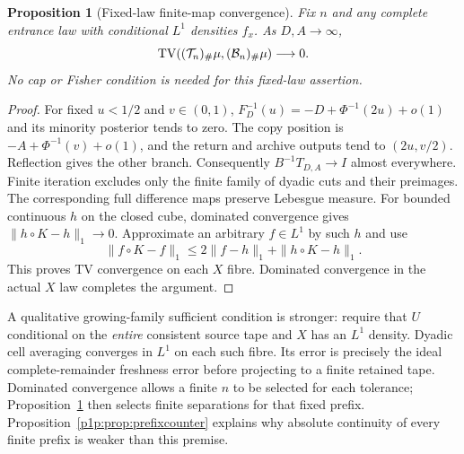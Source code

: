 \documentclass[11pt]{article}
\numberwithin{equation}{section}
\newtheorem{proposition}[theorem]{Proposition}
\theoremstyle{definition}
\theoremstyle{remark}
\begin{document}
\begin{proposition}[Fixed-law finite-map convergence]\label{p1p:prop:L1}
Fix $n$ and any complete entrance law with conditional $L^1$ densities
$f_x$. As $D,A\to\infty$,
\[
 \operatorname{TV}((\mathcal T_n)_\#\mu,(\mathcal B_n)_\#\mu)\longrightarrow0.
\]
No cap or Fisher condition is needed for this fixed-law assertion.
\end{proposition}
\begin{proof}
For fixed $u<1/2$ and $v\in(0,1)$,
$F_D^{-1}(u)=-D+\Phi^{-1}(2u)+o(1)$ and its minority posterior tends to
zero. The copy position is $-A+\Phi^{-1}(v)+o(1)$, and the return and
archive outputs tend to $(2u,v/2)$. Reflection gives the other branch.
Consequently $B^{-1}T_{D,A}\to I$ almost everywhere. Finite iteration
excludes only the finite family of dyadic cuts and their preimages.
The corresponding full difference maps preserve Lebesgue measure.
For bounded continuous $h$ on the closed cube, dominated convergence
gives $\|h\circ K-h\|_1\to0$. Approximate an arbitrary $f\in L^1$ by such
$h$ and use
\[
 \|f\circ K-f\|_1\leq2\|f-h\|_1+\|h\circ K-h\|_1.
\]
This proves TV convergence on each $X$ fibre. Dominated convergence in
the actual $X$ law completes the argument.
\end{proof}

A qualitative growing-family sufficient condition is stronger: require
that $U$ conditional on the \emph{entire} consistent source tape and $X$
has an $L^1$ density. Dyadic cell averaging converges in $L^1$ on each
such fibre. Its error is precisely the ideal complete-remainder
freshness error before projecting to a finite retained tape. Dominated
convergence allows a finite $n$ to be selected for each tolerance;
Proposition~\ref{p1p:prop:L1} then selects finite separations for that
fixed prefix. Proposition~\ref{p1p:prop:prefixcounter} explains why
absolute continuity of every finite prefix is weaker than this premise.
\end{document}
